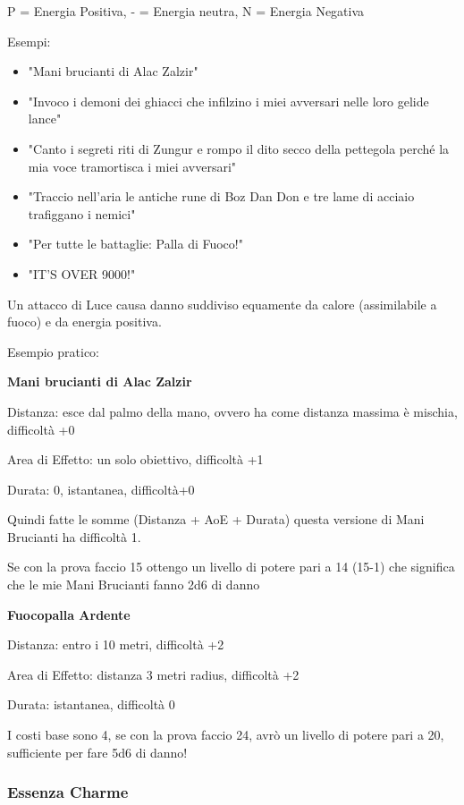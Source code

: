 \documentclass[a4paper,10 pt,twoside,openany]{book}
\begin{document}
P = Energia Positiva, - = Energia neutra, N = Energia Negativa
\bigskip

Esempi:
\begin{itemize}
	\item
	"Mani brucianti di Alac Zalzir"
	\item
	"Invoco i demoni dei ghiacci che infilzino i miei avversari nelle loro gelide lance"
	\item
	"Canto i segreti riti di Zungur e rompo il dito secco della pettegola perché la mia voce tramortisca i miei avversari"
	\item
	"Traccio nell'aria le antiche rune di Boz Dan Don e tre lame di acciaio trafiggano i nemici"
	\item
	"Per tutte le battaglie: Palla di Fuoco!"
	\item
	"IT'S OVER 9000!"
\end{itemize}
\bigskip

Un attacco di Luce causa danno suddiviso equamente da calore (assimilabile a fuoco) e da energia positiva.

Esempio pratico:

\textbf{Mani brucianti di Alac Zalzir}

Distanza: esce dal palmo della mano, ovvero ha come distanza massima è mischia, difficoltà +0

Area di Effetto: un solo obiettivo, difficoltà +1

Durata: 0, istantanea, difficoltà+0

Quindi fatte le somme (Distanza + AoE + Durata) questa versione di Mani Brucianti ha difficoltà 1.

Se con la prova faccio 15 ottengo un livello di potere pari a 14 (15-1) che significa che le mie Mani Brucianti fanno 2d6 di danno

\textbf{Fuocopalla Ardente}

Distanza: entro i 10 metri, difficoltà +2

Area di Effetto: distanza 3 metri radius, difficoltà +2

Durata: istantanea, difficoltà 0

I costi base sono 4, se con la prova faccio 24, avrò un livello di potere pari a 20, sufficiente per fare 5d6 di danno!

\pagebreak

\subsubsection{Essenza Charme}
\end{document}
